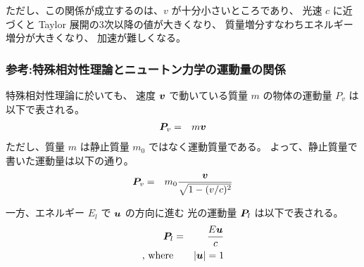 ただし、この関係が成立するのは、$v$ が十分小さいところであり、
光速 $c$ に近づくと Taylor 展開の3次以降の値が大きくなり、
質量増分すなわちエネルギー増分が大きくなり、
加速が難しくなる。

\subsubsection{参考:特殊相対性理論とニュートン力学の運動量の関係}
\label{sssec:宇宙船の加速:参考2}

特殊相対性理論に於いても、
速度 ${\bm{v}}$ で動いている質量 $m$ の物体の運動量 $P_v$ は以下で表される。
  \begin{eqnarray}
    {\bm{P}}_v & = & m {\bm{v}}
  \end{eqnarray}
ただし、質量 $m$ は静止質量 $m_0$ ではなく運動質量である。
よって、静止質量で書いた運動量は以下の通り。
  \begin{eqnarray}
    {\bm{P}}_v & = & m_0 \frac{{\bm{v}}}{\sqrt{1-(v/c)^2}}
  \end{eqnarray}

一方、エネルギー $E_l$ で ${\bm{u}}$ の方向に進む
光の運動量 ${\bm{P}}_l$ は以下で表される。
  \begin{eqnarray}
    {\bm{P}}_l & = & \frac{E{\bm{u}}}{c}
  \\
    \mbox{, where} & & \left| {\bm{u}} \right| = 1
  \end{eqnarray}
  
